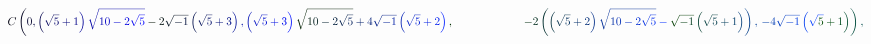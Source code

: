 \documentclass[12pt]{article}
\begin{document}
\makeatletter
\renewcommand*{\@textcolor}[3]{%
  \protect\leavevmode
  \begingroup
    \color#1{#2}#3%
  \endgroup
}
\makeatother
\begin{displaymath}
\mathcolor[RGB]{0,0,15}{C} \mathcolor[RGB]{0,0,30}{\left(} \mathcolor[RGB]{0,0,45}{0} \mathcolor[RGB]{0,0,60}{,} \mathcolor[RGB]{0,0,75}{\left(} \mathcolor[RGB]{0,0,90}{\sqrt { \mathcolor[RGB]{0,0,105}{5} } } \mathcolor[RGB]{0,0,120}{+} \mathcolor[RGB]{0,0,135}{1} \mathcolor[RGB]{0,0,150}{\right)} \mathcolor[RGB]{0,0,165}{\sqrt { \mathcolor[RGB]{0,0,180}{1} \mathcolor[RGB]{0,0,195}{0} \mathcolor[RGB]{0,0,210}{-} \mathcolor[RGB]{0,0,225}{2} \mathcolor[RGB]{0,0,240}{\sqrt { \mathcolor[RGB]{0,0,255}{5} } } } } \mathcolor[RGB]{0,15,0}{-} \mathcolor[RGB]{0,15,15}{2} \mathcolor[RGB]{0,15,30}{\sqrt { \mathcolor[RGB]{0,15,45}{-} \mathcolor[RGB]{0,15,60}{1} } } \mathcolor[RGB]{0,15,75}{\left(} \mathcolor[RGB]{0,15,90}{\sqrt { \mathcolor[RGB]{0,15,105}{5} } } \mathcolor[RGB]{0,15,120}{+} \mathcolor[RGB]{0,15,135}{3} \mathcolor[RGB]{0,15,150}{\right)} \mathcolor[RGB]{0,15,165}{,} \mathcolor[RGB]{0,15,180}{\left(} \mathcolor[RGB]{0,15,195}{\sqrt { \mathcolor[RGB]{0,15,210}{5} } } \mathcolor[RGB]{0,15,225}{+} \mathcolor[RGB]{0,15,240}{3} \mathcolor[RGB]{0,15,255}{\right)} \mathcolor[RGB]{0,30,0}{\sqrt { \mathcolor[RGB]{0,30,15}{1} \mathcolor[RGB]{0,30,30}{0} \mathcolor[RGB]{0,30,45}{-} \mathcolor[RGB]{0,30,60}{2} \mathcolor[RGB]{0,30,75}{\sqrt { \mathcolor[RGB]{0,30,90}{5} } } } } \mathcolor[RGB]{0,30,105}{+} \mathcolor[RGB]{0,30,120}{4} \mathcolor[RGB]{0,30,135}{\sqrt { \mathcolor[RGB]{0,30,150}{-} \mathcolor[RGB]{0,30,165}{1} } } \mathcolor[RGB]{0,30,180}{\left(} \mathcolor[RGB]{0,30,195}{\sqrt { \mathcolor[RGB]{0,30,210}{5} } } \mathcolor[RGB]{0,30,225}{+} \mathcolor[RGB]{0,30,240}{2} \mathcolor[RGB]{0,30,255}{\right)} \mathcolor[RGB]{0,45,0}{,} \, \qquad \qquad \qquad \mathcolor[RGB]{0,45,15}{-} \mathcolor[RGB]{0,45,30}{2} \mathcolor[RGB]{0,45,45}{\left(} \mathcolor[RGB]{0,45,60}{\left(} \mathcolor[RGB]{0,45,75}{\sqrt { \mathcolor[RGB]{0,45,90}{5} } } \mathcolor[RGB]{0,45,105}{+} \mathcolor[RGB]{0,45,120}{2} \mathcolor[RGB]{0,45,135}{\right)} \mathcolor[RGB]{0,45,150}{\sqrt { \mathcolor[RGB]{0,45,165}{1} \mathcolor[RGB]{0,45,180}{0} \mathcolor[RGB]{0,45,195}{-} \mathcolor[RGB]{0,45,210}{2} \mathcolor[RGB]{0,45,225}{\sqrt { \mathcolor[RGB]{0,45,240}{5} } } } } \mathcolor[RGB]{0,45,255}{-} \mathcolor[RGB]{0,60,0}{\sqrt { \mathcolor[RGB]{0,60,15}{-} \mathcolor[RGB]{0,60,30}{1} } } \mathcolor[RGB]{0,60,45}{\left(} \mathcolor[RGB]{0,60,60}{\sqrt { \mathcolor[RGB]{0,60,75}{5} } } \mathcolor[RGB]{0,60,90}{+} \mathcolor[RGB]{0,60,105}{1} \mathcolor[RGB]{0,60,120}{\right)} \mathcolor[RGB]{0,60,135}{\right)} \mathcolor[RGB]{0,60,150}{,} \, \mathcolor[RGB]{0,60,165}{-} \mathcolor[RGB]{0,60,180}{4} \mathcolor[RGB]{0,60,195}{\sqrt { \mathcolor[RGB]{0,60,210}{-} \mathcolor[RGB]{0,60,225}{1} } } \mathcolor[RGB]{0,60,240}{\left(} \mathcolor[RGB]{0,60,255}{\sqrt { \mathcolor[RGB]{0,75,0}{5} } } \mathcolor[RGB]{0,75,15}{+} \mathcolor[RGB]{0,75,30}{1} \mathcolor[RGB]{0,75,45}{\right)} \mathcolor[RGB]{0,75,60}{\right)} \mathcolor[RGB]{0,75,75}{,}
\end{displaymath}
\end{document}
